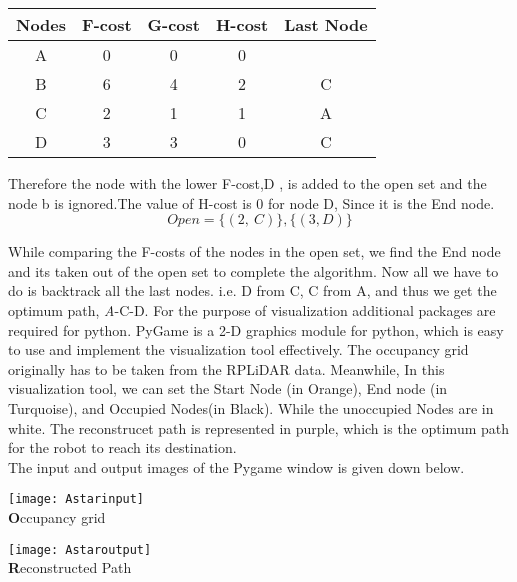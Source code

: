 \begin{center}
\begin{tabular}{ |c|c|c|c|c| } 
\hline
Nodes & F-cost & G-cost & H-cost & Last Node \\
\hline     
A & 0 & 0 & 0 &\\ 
B & 6 & 4 & 2 & C\\ 
C & 2 & 1 & 1 & A\\ 
D & 3 & 3 & 0 & C\\
\hline
\end{tabular}
\end{center}

Therefore the node with the lower F-cost,D , is added to the open set and the node b is ignored.The value of H-cost is 0 for node D, Since it is the End node.
\[Open = \{(2, \ C)\}, \{(3,D)\}\]

While comparing the F-costs of the nodes in the open set, we find the End node and its taken out of the open set to complete the algorithm.
Now all we have to do is backtrack all the last nodes. i.e. D from C, C from A, and thus we get the optimum path, \emph A-C-D.
For the purpose of visualization additional packages are required for python. PyGame is a 2-D graphics module for python, which is easy to use and implement the visualization tool effectively. 
The occupancy grid originally has to be taken from the RPLiDAR data. Meanwhile, In this visualization tool, we can set the Start Node (in Orange), End node (in Turquoise), and Occupied Nodes(in Black). While the unoccupied Nodes are in white. The reconstrucet path is represented in purple, which is the optimum path for the robot to reach its destination.\\
The input and output images of the Pygame window is given down below.\\

\begin{multicols}{2}
\centering
 \begin{center}   
        \texttt{[image: Astarinput]}\\
        \textbf Occupancy grid
    \end{center}
     \begin{center}   
        \texttt{[image: Astaroutput]}\\
        \textbf Reconstructed Path
    \end{center}
\end{multicols}





